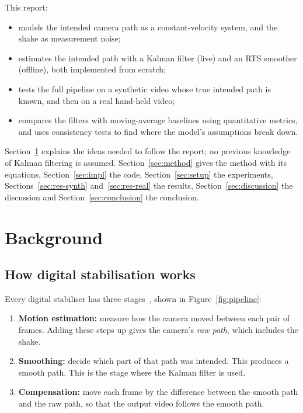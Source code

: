 \documentclass[11pt,a4paper]{article}
\begin{document}
This report:
\begin{itemize}
  \item models the intended camera path as a constant-velocity system, and the shake as
        measurement noise;
  \item estimates the intended path with a Kalman filter (live) and an RTS smoother
        (offline), both implemented from scratch;
  \item tests the full pipeline on a synthetic video whose true intended path is known, and
        then on a real hand-held video;
  \item compares the filters with moving-average baselines using quantitative metrics, and
        uses consistency tests to find where the model's assumptions break down.
\end{itemize}

Section~\ref{sec:background} explains the ideas needed to follow the report; no previous
knowledge of Kalman filtering is assumed. Section~\ref{sec:method} gives the method with its
equations, Section~\ref{sec:impl} the code, Section~\ref{sec:setup} the experiments,
Sections~\ref{sec:res-synth} and~\ref{sec:res-real} the results,
Section~\ref{sec:discussion} the discussion and Section~\ref{sec:conclusion} the conclusion.

\section{Background}\label{sec:background}

\subsection{How digital stabilisation works}
Every digital stabiliser has three stages~\cite{morimoto1998}, shown in
Figure~\ref{fig:pipeline}:
\begin{enumerate}
  \item \textbf{Motion estimation:} measure how the camera moved between each pair of
        frames. Adding these steps up gives the camera's \emph{raw path}, which includes the
        shake.
  \item \textbf{Smoothing:} decide which part of that path was intended. This produces a
        smooth path. This is the stage where the Kalman filter is used.
  \item \textbf{Compensation:} move each frame by the difference between the smooth path and
        the raw path, so that the output video follows the smooth path.
\end{enumerate}
\end{document}
